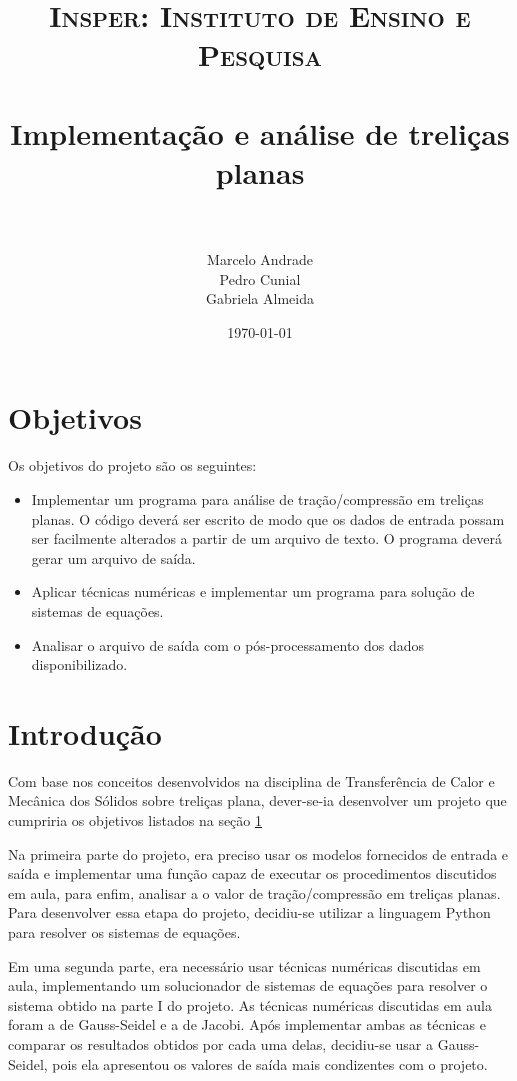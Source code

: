 \documentclass[paper=a4, fontsize=11pt]{scrartcl}
\title{
		\usefont{OT1}{bch}{b}{n}
		\normalfont \normalsize \textsc{Insper: Instituto de Ensino e Pesquisa} \\ [25pt] %
		\horrule{0.5pt} \\[0.4cm]														  
		\huge Implementação e análise de treliças planas \\			%
		\horrule{2pt} \\[0.5cm]
}
\author{										%
		\normalfont 								\normalsize
        Marcelo Andrade\\[-3pt]		\normalsize
		Pedro Cunial\\[-3pt]		\normalsize
        Gabriela Almeida\\[-3pt]		\normalsize
}
\date{\today}
\begin{document}
	
\maketitle

\newpage

\tableofcontents

\newpage


\section{Objetivos} \label{sec:objetivos}
Os objetivos do projeto são os seguintes:

\begin{itemize}
	\item Implementar um programa para análise de tração/compressão em
	treliças planas. O código deverá ser escrito de modo que os dados de entrada
	possam ser facilmente alterados a partir de um arquivo de texto. O programa deverá gerar um arquivo de saída.
	
	\item Aplicar técnicas numéricas e implementar um programa para
	solução de sistemas de equações. 
	
	\item Analisar o arquivo de saída com o pós-processamento dos dados
	disponibilizado. 
\end{itemize}

\section{Introdução}

Com base nos conceitos desenvolvidos na disciplina de Transferência de Calor e Mecânica dos Sólidos sobre treliças plana, dever-se-ia desenvolver um projeto que cumpriria os objetivos listados na seção \ref{sec:objetivos}

Na primeira parte do projeto, era preciso usar os modelos fornecidos de entrada e saída e implementar uma função capaz de executar os procedimentos discutidos em aula, para enfim, analisar a o valor de tração/compressão em treliças planas. Para desenvolver essa etapa do projeto, decidiu-se utilizar a linguagem Python para resolver os sistemas de equações.

Em uma segunda parte, era necessário usar técnicas numéricas discutidas em aula, implementando um solucionador de sistemas de equações para resolver o sistema obtido na parte I do projeto. As técnicas numéricas discutidas em aula foram a de Gauss-Seidel e a de Jacobi. Após implementar ambas as técnicas e comparar os resultados obtidos por cada uma delas, decidiu-se usar a Gauss-Seidel, pois ela apresentou os valores de saída mais condizentes com o projeto.
\end{document}
